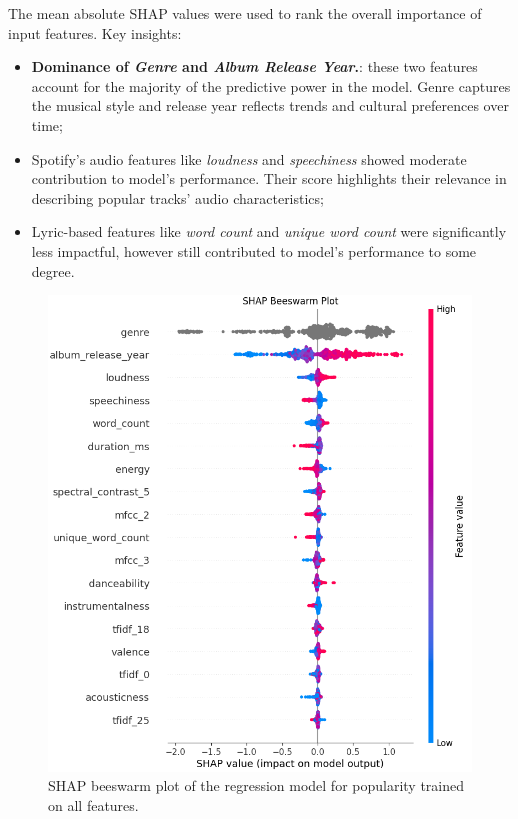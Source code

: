 The mean absolute SHAP values were used to rank the overall importance of input
features. Key insights:
\begin{itemize}
  \item \textbf{Dominance of \textit{Genre} and \textit{Album Release Year}.}:
    these two features account for the majority of the predictive power in the
    model. Genre captures the musical style and release year reflects trends
    and cultural preferences over time;
  \item Spotify's audio features like \textit{loudness} and
    \textit{speechiness} showed moderate contribution to model's performance.
    Their score highlights their relevance in describing popular tracks' audio
    characteristics;
  \item Lyric-based features like \textit{word count} and \textit{unique word
    count} were significantly less impactful, however still contributed to
    model's performance to some degree.
\end{itemize}

\begin{center}
\begin{figure}[H]
  \centering
  \includegraphics[width=5in]{img/beeswarm_popularity_reg.png}
  \caption{SHAP beeswarm plot of the regression model for popularity trained on all features.}
  \label{Figure:fig_beh}
\end{figure}
\end{center}

